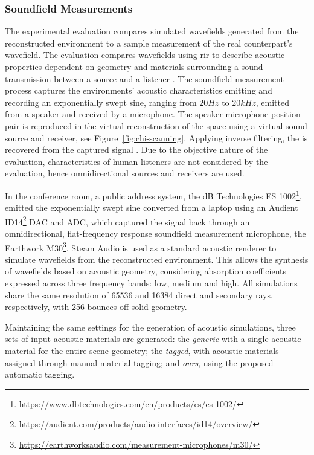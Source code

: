 \subsubsection{Soundfield Measurements}
The experimental evaluation compares simulated wavefields generated from the reconstructed environment to a sample measurement of the real counterpart's wavefield. The evaluation compares wavefields using \acrshort{rir} to describe acoustic properties dependent on geometry and materials surrounding a sound transmission between a source and a listener \citep{stan2002comparison}. The soundfield measurement process captures the environments' acoustic characteristics emitting and recording an exponentially swept sine, ranging from $20Hz$ to $20kHz$, emitted from a speaker and received by a microphone. The speaker-microphone position pair is reproduced in the virtual reconstruction of the space using a virtual sound source and receiver, see Figure~\ref{fig:chi-scanning}. Applying inverse filtering, the  is recovered from the captured signal \citep{holters2009impulse}. Due to the objective nature of the evaluation, characteristics of human listeners are not considered by the evaluation, hence omnidirectional sources and receivers are used.\par
In the conference room, a public address system, the dB Technologies ES 1002\footnote{\url{https://www.dbtechnologies.com/en/products/es/es-1002/}}, emitted the exponentially swept sine converted from a laptop using an Audient ID14\footnote{\url{https://audient.com/products/audio-interfaces/id14/overview/}} DAC and ADC, which captured the signal back through an omnidirectional, flat-frequency response soundfield measurement microphone, the Earthwork M30\footnote{\url{https://earthworksaudio.com/measurement-microphones/m30/}}.
Steam Audio \citep{audio2020git} is used as a standard acoustic renderer to simulate wavefields from the reconstructed environment. This allows the synthesis of wavefields based on acoustic geometry, considering absorption coefficients expressed across three frequency bands: low, medium and high. All simulations share the same resolution of 65536 and 16384 direct and secondary rays, respectively, with 256 bounces off solid geometry. \par
Maintaining the same settings for the generation of acoustic simulations, three sets of input acoustic materials are generated: the \emph{generic} with a single acoustic material for the entire scene geometry; the \emph{tagged}, with acoustic materials assigned through manual material tagging; and \emph{ours}, using the proposed automatic tagging.

